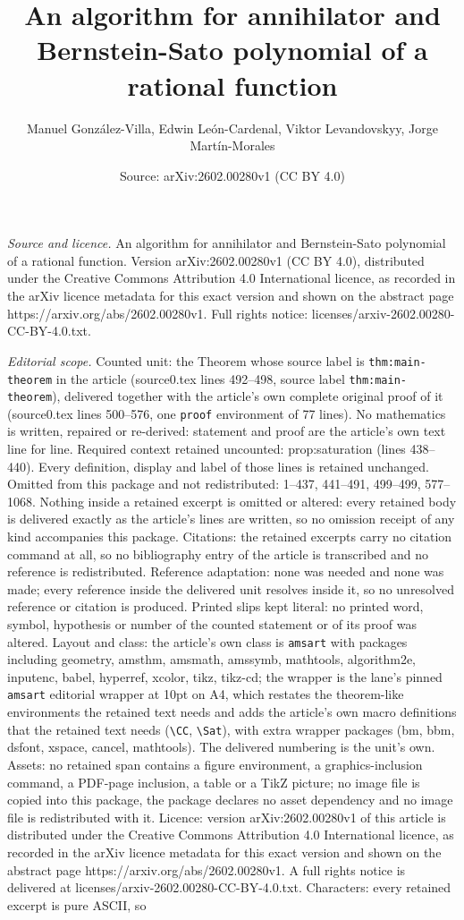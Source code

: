 \documentclass[10pt,a4paper]{amsart}
\title[An algorithm for annihilator and Bernstein-Sato polynomial o]{An algorithm for annihilator and Bernstein-Sato polynomial of a rational function}
\author{Manuel Gonz\'alez-Villa, Edwin Le\'on-Cardenal, Viktor Levandovskyy, Jorge Mart\'in-Morales}
\date{Source: arXiv:2602.00280v1 (CC BY 4.0)}
\begin{document}
\maketitle

\noindent\emph{Source and licence.} An algorithm for annihilator and Bernstein-Sato polynomial of a rational function. Version arXiv:2602.00280v1 (CC BY 4.0), distributed under the Creative Commons Attribution 4.0 International licence, as recorded in the arXiv licence metadata for this exact version and shown on the abstract page https://arxiv.org/abs/2602.00280v1. Full rights notice: licenses/arxiv-2602.00280-CC-BY-4.0.txt.\par\smallskip

\noindent\textit{Editorial scope.} Counted unit: the Theorem whose source label is \texttt{thm:main-theorem} in the article (source0.tex lines 492--498, source label \texttt{thm:main-theorem}), delivered together with the article's own complete original proof of it (source0.tex lines 500--576, one \texttt{proof} environment of 77 lines). No mathematics is written, repaired or re-derived: statement and proof are the article's own text line for line. Required context retained uncounted: prop:saturation (lines 438--440). Every definition, display and label of those lines is retained unchanged. Omitted from this package and not redistributed: 1--437, 441--491, 499--499, 577--1068. Nothing inside a retained excerpt is omitted or altered: every retained body is delivered exactly as the article's lines are written, so no omission receipt of any kind accompanies this package. Citations: the retained excerpts carry no citation command at all, so no bibliography entry of the article is transcribed and no reference is redistributed. Reference adaptation: none was needed and none was made; every reference inside the delivered unit resolves inside it, so no unresolved reference or citation is produced. Printed slips kept literal: no printed word, symbol, hypothesis or number of the counted statement or of its proof was altered. Layout and class: the article's own class is \texttt{amsart} with packages including geometry, amsthm, amsmath, amssymb, mathtools, algorithm2e, inputenc, babel, hyperref, xcolor, tikz, tikz-cd; the wrapper is the lane's pinned \texttt{amsart} editorial wrapper at 10pt on A4, which restates the theorem-like environments the retained text needs and adds the article's own macro definitions that the retained text needs (\texttt{\textbackslash CC}, \texttt{\textbackslash Sat}), with extra wrapper packages (bm, bbm, dsfont, xspace, cancel, mathtools). The delivered numbering is the unit's own. Assets: no retained span contains a figure environment, a graphics-inclusion command, a PDF-page inclusion, a table or a TikZ picture; no image file is copied into this package, the package declares no asset dependency and no image file is redistributed with it. Licence: version arXiv:2602.00280v1 of this article is distributed under the Creative Commons Attribution 4.0 International licence, as recorded in the arXiv licence metadata for this exact version and shown on the abstract page https://arxiv.org/abs/2602.00280v1. A full rights notice is delivered at licenses/arxiv-2602.00280-CC-BY-4.0.txt. Characters: every retained excerpt is pure ASCII, so 
\end{document}
